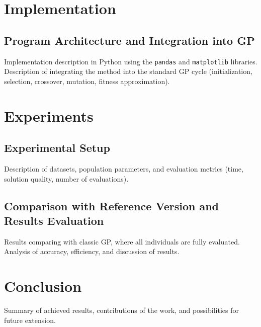 \documentclass[12pt,a4paper]{report}
\begin{document}
\chapter{Implementation}
\label{chap:implementation}

\section{Program Architecture and Integration into GP}
\label{sec:architecture-integration}
Implementation description in Python using the \texttt{pandas} and \texttt{matplotlib} libraries. Description of integrating the method into the standard GP cycle (initialization, selection, crossover, mutation, fitness approximation).

\chapter{Experiments}
\label{chap:experiments}

\section{Experimental Setup}
\label{sec:experimental-setup}
Description of datasets, population parameters, and evaluation metrics (time, solution quality, number of evaluations).

\section{Comparison with Reference Version and Results Evaluation}
\label{sec:comparison-results}
Results comparing with classic GP, where all individuals are fully evaluated. Analysis of accuracy, efficiency, and discussion of results.

\chapter{Conclusion}
\label{chap:conclusion}
Summary of achieved results, contributions of the work, and possibilities for future extension.
\end{document}
